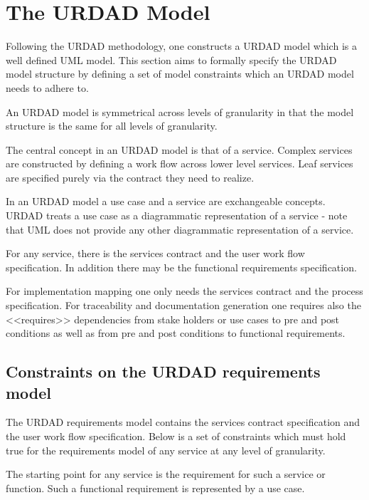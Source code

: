 \section{The URDAD Model}

Following the URDAD methodology, one constructs a URDAD model which is a well defined UML model.
This section aims to formally specify the URDAD model structure by defining a set of model constraints
which an URDAD model needs to adhere to.

An URDAD model is symmetrical across levels of granularity in that the model structure is the same for all
levels of granularity.

The central concept in an URDAD model is that of a service. Complex services are constructed by
defining a work flow across lower level services. Leaf services are specified purely via the contract
they need to realize.

In an URDAD model a use case and a service are exchangeable concepts. URDAD treats a use case as a
diagrammatic representation of a service - note that UML does not provide any other diagrammatic representation of a service.

For any service, there is the services contract and the user work flow specification. In addition there
may be the functional requirements specification.
 
For implementation mapping one only needs the services contract and the process specification. For traceability and documentation generation one requires also the <<requires>> dependencies from
stake holders or use cases to pre and post conditions as well as from pre and post conditions to functional requirements.


\subsection{Constraints on the URDAD requirements model}

The URDAD requirements model contains the services contract specification and the user work flow specification. Below is a set of constraints which must hold true for the requirements model of
any service at any level of granularity.

The starting point for any service is the requirement for such a service or function. Such a functional
requirement is represented by a use case.

